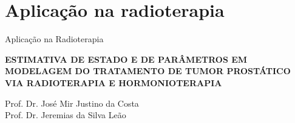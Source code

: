 \documentclass{beamer}
\theoremstyle{definition}
\begin{document}
\section{Aplicação na radioterapia}
\begin{frame}{Aplicação na Radioterapia}
    \begin{center}
        \textbf{ESTIMATIVA DE ESTADO E DE PARÂMETROS EM MODELAGEM DO TRATAMENTO DE TUMOR PROSTÁTICO
VIA RADIOTERAPIA E HORMONIOTERAPIA}
    \end{center}
    \begin{center}
        Prof. Dr. José Mir Justino da Costa \\
        Prof. Dr. Jeremias da Silva Leão
    \end{center}
\end{frame}
\end{document}
